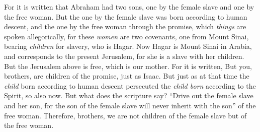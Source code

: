\begin{biblechapter}
\verse For it is written that Abraham had two sons, one by the female slave and one by the free woman.
\verse But the one by the female slave was born according to human descent, and the one by the free woman through the promise,
\verse which \textit{things} are spoken allegorically, for these \textit{women} are two covenants, one from Mount Sinai, bearing \textit{children} for slavery, who is Hagar.
\verse Now Hagar is Mount Sinai in Arabia, and corresponds to the present Jerusalem, for she is a slave with her children.
\verse But the Jerusalem above is free, which is our mother.
\verse For it is written,
\verse But you, brothers, are children of the promise, just as Isaac.
\verse But just as at that time the \textit{child} born according to human descent persecuted the \textit{child born} according to the Spirit, so also now.
\verse But what does the scripture say? “Drive out the female slave and her son, for the son of the female slave will never inherit with the son” of the free woman.
\verse Therefore, brothers, we are not children of the female slave but of the free woman.
\end{biblechapter}

